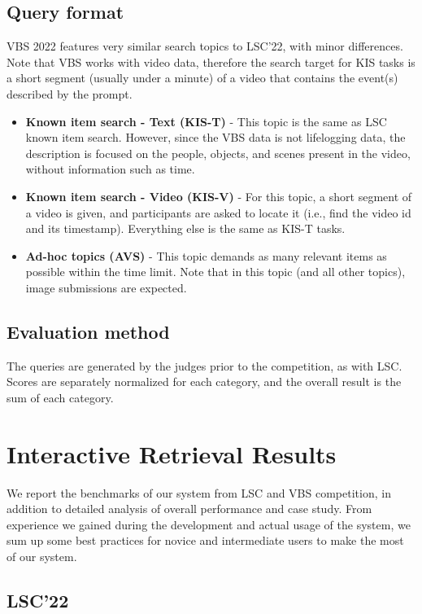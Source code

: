 \subsection{Query format}

VBS 2022 features very similar search topics to LSC'22, with minor differences. Note that VBS works with video data, therefore the search target for KIS tasks is a short segment (usually under a minute) of a video that contains the event(s) described by the prompt.

\begin{itemize}
    \item \textbf{Known item search - Text (KIS-T)} - This topic is the same as LSC known item search. However, since the VBS data is not lifelogging data, the description is focused on the people, objects, and scenes present in the video, without information such as time.
    \item \textbf{Known item search - Video (KIS-V)} - For this topic, a short segment of a video is given, and participants are asked to locate it (i.e., find the video id and its timestamp). Everything else is the same as KIS-T tasks. 
    \item \textbf{Ad-hoc topics (AVS)} - This topic demands as many relevant items as possible within the time limit. Note that in this topic (and all other topics), image submissions are expected.
\end{itemize}

\subsection{Evaluation method}

The queries are generated by the judges prior to the competition, as with LSC. Scores are separately normalized for each category, and the overall result is the sum of each category.

\section{Interactive Retrieval Results}

We report the benchmarks of our system from LSC and VBS competition, in addition to detailed analysis of overall performance and case study. From experience we gained during the development and actual usage of the system, we sum up some best practices for novice and intermediate users to make the most of our system.

\subsection{LSC'22}
\label{sec:LSC22}

